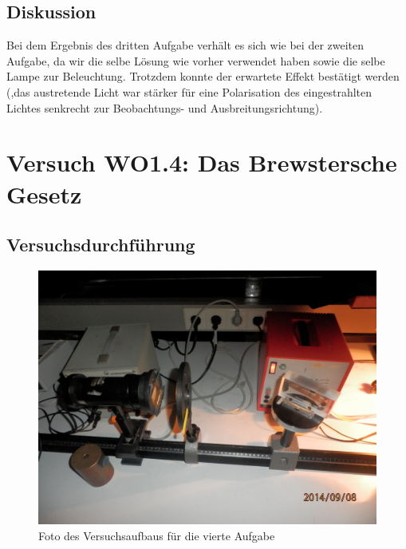 \documentclass[12pt]{scrartcl}
\begin{document}
\subsection{Diskussion}
Bei dem Ergebnis des dritten Aufgabe verhält es sich wie bei der zweiten Aufgabe, da wir die selbe Lösung wie vorher verwendet haben sowie die selbe Lampe zur Beleuchtung. Trotzdem konnte der erwartete Effekt bestätigt werden (,das austretende Licht war stärker für eine Polarisation des eingestrahlten Lichtes senkrecht zur Beobachtungs- und Ausbreitungsrichtung).

\section{Versuch WO1.4:
Das Brewstersche Gesetz}
\subsection{Versuchsdurchführung}

\begin{figure}[H]
\centering
    \includegraphics[scale = 0.1]{aufgabe_4.JPG}
  	\caption[Foto des Versuchsaufbaus für die vierte Aufgabe]{Foto des Versuchsaufbaus für die vierte Aufgabe}
  \label{fig:aufgabe_4}
\end{figure}
\end{document}
